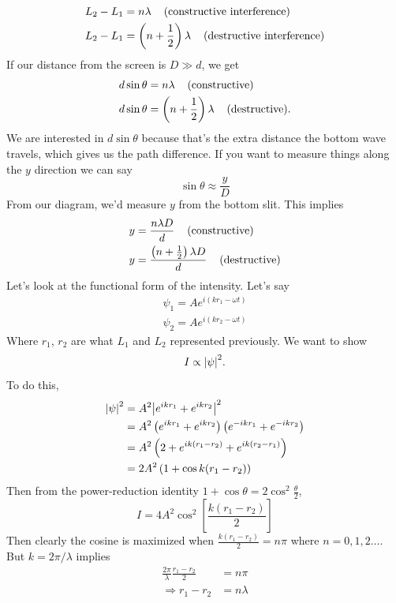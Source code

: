 \documentclass{report}
\numberwithin{equation}{section}
\begin{document}
\begin{align}
		L_2 - L_1 &= n\lambda \hspace{0.4cm}\text{(constructive interference)}\\
		L_2 - L_1 &= \left(n+\frac{1}{2}\right)\lambda\hspace{0.4cm}\text{(destructive interference)}
\end{align}
If our distance from the screen is $D\gg d$, we get
\begin{align}
	d\sin\theta &= n\lambda \hspace{0.4cm}\text{(constructive)}\\
	d\sin\theta &= \left(n + \frac{1}{2}\right)\lambda \hspace{0.4cm}\text{(destructive)}.
\end{align}
We are interested in $d\sin\theta$ because that's the extra distance the bottom wave travels, which gives us the path difference. If you want to measure things along the $y$ direction we can say
\begin{equation}
		\sin\theta \approx \frac{y}{D}
\end{equation}
From our diagram, we'd measure $y$ from the bottom slit. This implies
\begin{align}
	y &= \frac{n\lambda D}{d}\hspace{0.4cm}\text{(constructive)}\\
	y &= \frac{\left(n + \frac{1}{2}\right)\lambda D}{d}\hspace{0.4cm}\text{(destructive)}
\end{align}
Let's look at the functional form of the intensity. Let's say
\begin{align*}
	\psi_1 = Ae^{i(kr_1 - \omega t)}\\
	\psi_2 = Ae^{i(kr_2 - \omega t)}
\end{align*}
Where $r_1$, $r_2$ are what $L_1$ and $L_2$ represented previously. We want to show
\begin{equation}
		I \propto \abs{\psi}^2.
\end{equation}
To do this,
\begin{align*}
	\abs{\psi}^2 &= A^2\abs{e^{ikr_1}+e^{ikr_2}}^2\\
	&= A^2\left(e^{ikr_1}+e^{ikr_2}\right)\left(e^{-ikr_1}+e^{-ikr_2}\right)\\
	&= A^2\left(2 + e^{ik(r_1-r_2)} + e^{ik(r_2-r_1)}\right)\\
	&= 2A^2\left(1+ \cos k(r_1 - r_2)\right)
\end{align*}
Then from the power-reduction identity $1+\cos\theta = 2\cos^2\!\frac{\theta}{2}$,
\begin{equation}
		I = 4A^2\cos^2 \left[\frac{k(r_1-r_2)}{2}\right]
\end{equation}
Then clearly the cosine is maximized when $\frac{k(r_1-r_2)}{2} = n\pi$ where $n = 0,1,2\dots$. But $k = 2\pi / \lambda$ implies
\begin{align*}
	\frac{2\pi}{\lambda} \frac{r_1 - r_2}{2} &= n\pi\\
	\Rightarrow r_1-r_2 &= n\lambda
\end{align*}
\end{document}

